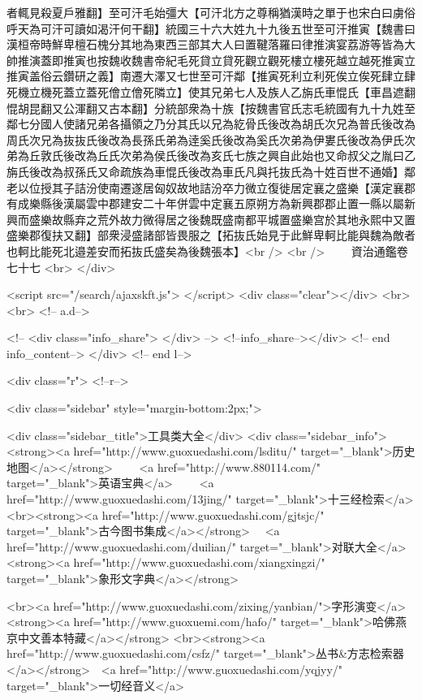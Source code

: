 者輒見殺夏戶雅翻】至可汗毛始彊大【可汗北方之尊稱猶漢時之單于也宋白曰虜俗呼天為可汗可讀如渴汗何干翻】統國三十六大姓九十九後五世至可汗推寅【魏書曰漢桓帝時鮮卑檀石槐分其地為東西三部其大人曰置鞬落羅曰律推演宴荔游等皆為大帥推演蓋即推寅也按魏收魏書帝紀毛死貸立貸死觀立觀死樓立樓死越立越死推寅立推寅盖俗云鑽研之義】南遷大澤又七世至可汗鄰【推寅死利立利死俟立俟死肆立肆死機立機死蓋立蓋死儈立儈死隣立】使其兄弟七人及族人乙旃氏車惃氏【車昌遮翻惃胡昆翻又公渾翻又古本翻】分統部衆為十族【按魏書官氏志毛統國有九十九姓至鄰七分國人使諸兄弟各攝領之乃分其氏以兄為紇骨氏後改為胡氏次兄為普氏後改為周氏次兄為抜抜氏後改為長孫氏弟為逹奚氏後改為奚氏次弟為伊婁氏後改為伊氏次弟為丘敦氏後改為丘氏次弟為侯氏後改為亥氏七族之興自此始也又命叔父之胤曰乙旃氏後改為叔孫氏又命疏族為車惃氏後改為車氏凡與托抜氏為十姓百世不通婚】鄰老以位授其子詰汾使南遷遂居匈奴故地詰汾卒力微立復徙居定襄之盛樂【漢定襄郡有成樂縣後漢屬雲中郡建安二十年併雲中定襄五原朔方為新興郡郡止置一縣以屬新興而盛樂故縣弃之荒外故力微得居之後魏既盛南都平城置盛樂宫於其地永熙中又置盛樂郡復扶又翻】部衆浸盛諸部皆畏服之【拓抜氏始見于此鮮卑軻比能與魏為敵者也軻比能死北邉差安而拓抜氏盛矣為後魏張本】<br />
<br />
　　資治通鑑卷七十七  <br>
   </div> 

<script src="/search/ajaxskft.js"> </script>
 <div class="clear"></div>
<br>
<br>
 <!-- a.d-->

 <!--
<div class="info_share">
</div> 
-->
 <!--info_share--></div>   <!-- end info_content-->
  </div> <!-- end l-->

<div class="r">   <!--r-->



<div class="sidebar"  style="margin-bottom:2px;">

 
<div class="sidebar_title">工具类大全</div>
<div class="sidebar_info">
<strong><a href="http://www.guoxuedashi.com/lsditu/" target="_blank">历史地图</a></strong>　　
<a href="http://www.880114.com/" target="_blank">英语宝典</a>　　
<a href="http://www.guoxuedashi.com/13jing/" target="_blank">十三经检索</a>　
<br><strong><a href="http://www.guoxuedashi.com/gjtsjc/" target="_blank">古今图书集成</a></strong>　
<a href="http://www.guoxuedashi.com/duilian/" target="_blank">对联大全</a>　<strong><a href="http://www.guoxuedashi.com/xiangxingzi/" target="_blank">象形文字典</a></strong>　

<br><a href="http://www.guoxuedashi.com/zixing/yanbian/">字形演变</a>　　<strong><a href="http://www.guoxuemi.com/hafo/" target="_blank">哈佛燕京中文善本特藏</a></strong>
<br><strong><a href="http://www.guoxuedashi.com/csfz/" target="_blank">丛书&方志检索器</a></strong>　<a href="http://www.guoxuedashi.com/yqjyy/" target="_blank">一切经音义</a>　　

